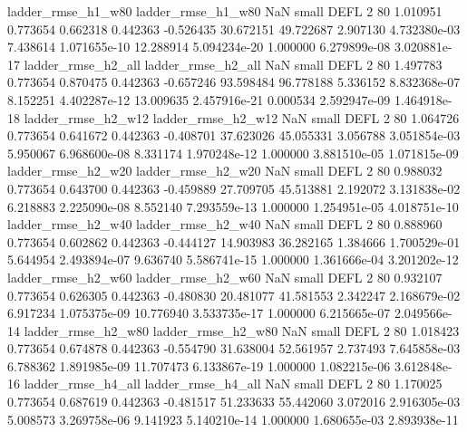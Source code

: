       ladder_rmse_h1_w80       ladder_rmse_h1_w80                   NaN      small     DEFL                 2 80 1.010951       0.773654 0.662318       0.442363   -0.526435     30.672151     49.722687     2.907130   4.732380e-03  7.438614 1.071655e-10    12.288914   5.094234e-20            1.000000    6.279899e-08        3.020881e-17
      ladder_rmse_h2_all       ladder_rmse_h2_all                   NaN      small     DEFL                 2 80 1.497783       0.773654 0.870475       0.442363   -0.657246     93.598484     96.778188     5.336152   8.832368e-07  8.152251 4.402287e-12    13.009635   2.457916e-21            0.000534    2.592947e-09        1.464918e-18
      ladder_rmse_h2_w12       ladder_rmse_h2_w12                   NaN      small     DEFL                 2 80 1.064726       0.773654 0.641672       0.442363   -0.408701     37.623026     45.055331     3.056788   3.051854e-03  5.950067 6.968600e-08     8.331174   1.970248e-12            1.000000    3.881510e-05        1.071815e-09
      ladder_rmse_h2_w20       ladder_rmse_h2_w20                   NaN      small     DEFL                 2 80 0.988032       0.773654 0.643700       0.442363   -0.459889     27.709705     45.513881     2.192072   3.131838e-02  6.218883 2.225090e-08     8.552140   7.293559e-13            1.000000    1.254951e-05        4.018751e-10
      ladder_rmse_h2_w40       ladder_rmse_h2_w40                   NaN      small     DEFL                 2 80 0.888960       0.773654 0.602862       0.442363   -0.444127     14.903983     36.282165     1.384666   1.700529e-01  5.644954 2.493894e-07     9.636740   5.586741e-15            1.000000    1.361666e-04        3.201202e-12
      ladder_rmse_h2_w60       ladder_rmse_h2_w60                   NaN      small     DEFL                 2 80 0.932107       0.773654 0.626305       0.442363   -0.480830     20.481077     41.581553     2.342247   2.168679e-02  6.917234 1.075375e-09    10.776940   3.533735e-17            1.000000    6.215665e-07        2.049566e-14
      ladder_rmse_h2_w80       ladder_rmse_h2_w80                   NaN      small     DEFL                 2 80 1.018423       0.773654 0.674878       0.442363   -0.554790     31.638004     52.561957     2.737493   7.645858e-03  6.788362 1.891985e-09    11.707473   6.133867e-19            1.000000    1.082215e-06        3.612848e-16
      ladder_rmse_h4_all       ladder_rmse_h4_all                   NaN      small     DEFL                 2 80 1.170025       0.773654 0.687619       0.442363   -0.481517     51.233633     55.442060     3.072016   2.916305e-03  5.008573 3.269758e-06     9.141923   5.140210e-14            1.000000    1.680655e-03        2.893938e-11
